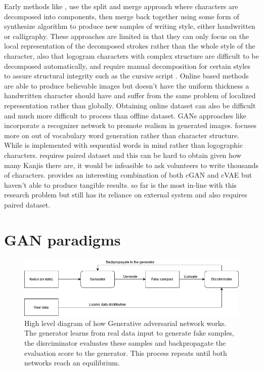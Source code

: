 \documentclass[12pt]{report}
\begin{document}
Early methods like \cite{automatic-calligraphy}, \cite{automatic-handwritten} use the split and merge approach where characters are decomposed into components, then merge back together using some form of synthesize algorithm to produce new samples of writing style, either handwritten or calligraphy. These approaches are limited in that they can only focus on the local representation of the decomposed strokes rather than the whole style of the character, also that logogram characters with complex structure are difficult to be decomposed automatically, and require manual decomposition for certain styles to assure structural integrity such as the cursive script \cite{intel-system}.
Online based methods \cite{online-kanji} \cite{online-kanji-2} are able to produce believable images but doesn’t have the uniform thickness a handwritten character should have and suffer from the same problem of localized representation rather than globally. Obtaining online dataset can also be difficult and much more difficult to process than offline dataset.
GANs approaches like \cite{zi2zi}\cite{handwritten-cgan}\cite{calligan}\cite{scrabble-gan}\cite{gan-writting} incorporate a recognizer network to promote realism in generated images. \cite{gan-writting} focuses more on out of vocabulary word generation rather than character structure. While \cite{scrabble-gan} is implemented with sequential words in mind rather than logographic characters. \cite{zi2zi} requires paired dataset and this can be hard to obtain given how many Kanjis there are, it would be infeasible to ask volunteers to write thousands of characters. \cite{handwritten-cgan} provides an interesting combination of both cGAN \cite{cgan} and cVAE \cite{cvae} but haven’t able to produce tangible results. \cite{calli-gan} so far is the most in-line with this research problem but still has its reliance on external system \cite{casia} and also requires paired dataset.

\section{GAN paradigms}

\begin{figure}[h]
	\centering
	\includegraphics[scale=0.6]{gan-diagram}
	\caption{High level diagram of how Generative adversarial network \cite{gan} works. The generator learns from real data input to generate fake samples, the disrciminator evaluates these samples and backpropagate the evaluation score to the generator. This process repeats until both networks reach an equilibrium.}
	\label{fig:gan-diagram}
\end{figure}
\end{document}

